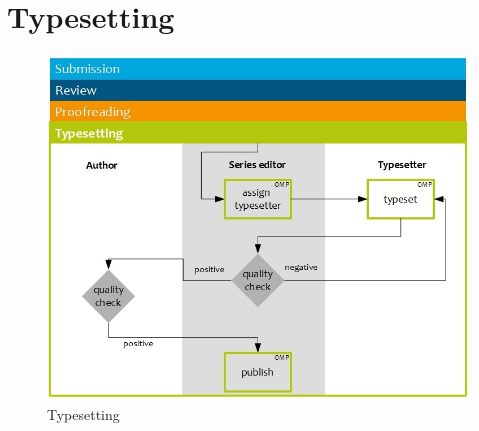 



\newpage


\section{Typesetting} 

\begin{figure}[h] \centering
\includegraphics[width=1\textwidth]{./img/workflow_typesetting.jpg} \caption{Typesetting}
\label{fig:workflowTypesetting}
\end{figure}


